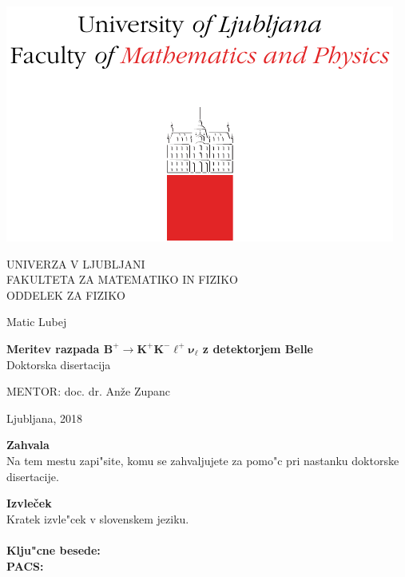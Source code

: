 \documentclass[longbibliography,a4paper,12pt]{book}
\begin{document}
\cleardoublepage
\begin{otherlanguage}{slovene}
\begin{center}

\includegraphics[trim={0 0 0 2cm},clip]{logo}

{\large UNIVERZA V LJUBLJANI\\
FAKULTETA ZA MATEMATIKO IN FIZIKO\\
ODDELEK ZA FIZIKO\\}

\vspace{5cm}

{\Large Matic Lubej\\}

\vspace{10mm}

{\bf \Large Meritev razpada $\bm{B^+ \to K^+K^-\ell^+\nu_\ell}$ z detektorjem Belle\\}
\vspace{5mm}
{\large Doktorska disertacija}\\

\vfill

{\large MENTOR: doc. dr. An\v ze Zupanc\\
}



\vspace{2cm}

{\large Ljubljana, 2018}

\end{center}



\cleardoublepage
\setcounter{page}{0}

\mbox{}
\vfill
{\Large \bf Zahvala}
\vspace{1cm}\\
Na tem mestu zapi"site, komu se zahvaljujete za pomo"c 
pri nastanku doktorske disertacije.


\cleardoublepage
{\Large\bf Izvle\v cek}
\vspace{1cm}\\
Kratek izvle"cek v slovenskem jeziku.\\
\vspace{1cm}\\
{\bf Klju"cne besede:}\\
{\bf PACS:}
\end{otherlanguage}
\end{document}
